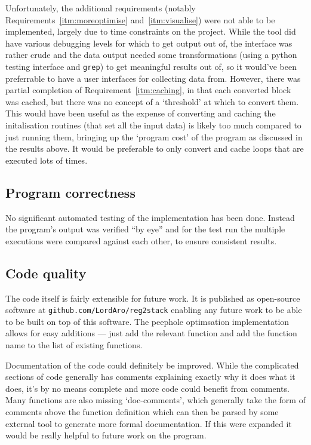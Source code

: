 Unfortunately, the additional requirements (notably
Requirements~\ref{itm:moreoptimise} and~\ref{itm:visualise}) were not able to be
implemented, largely due to time constraints on the project. While the tool did
have various debugging levels for which to get output out of, the interface was
rather crude and the data output needed some transformations (using a python
testing interface and \texttt{grep}) to get meaningful results out of, so it
would've been preferrable to have a user interfaces for collecting data from.
However, there was partial completion of Requirement~\ref{itm:caching}, in that
each converted block was cached, but there was no concept of a `threshold' at
which to convert them. This would have been useful as the expense of converting
and caching the initalisation routines (that set all the input data) is likely
too much compared to just running them, bringing up the `program cost' of the
program as discussed in the results above. It would be preferable to only
convert and cache loops that are executed lots of times.

\subsection{Program correctness}
No significant automated testing of the implementation has been done. Instead
the program's output was verified ``by eye'' and for the test run the multiple
executions were compared against each other, to ensure consistent results.

\subsection{Code quality}
The code itself is fairly extensible for future work. It is published as
open-source software at \texttt{github.com/LordAro/reg2stack} enabling any
future work to be able to be built on top of this software. The peephole
optimsation implementation allows for easy additions --- just add the relevant
function and add the function name to the list of existing functions.

Documentation of the code could definitely be improved. While the complicated
sections of code generally has comments explaining exactly why it does what it
does, it's by no means complete and more code could benefit from comments. Many
functions are also missing `doc-comments', which generally take the form of
comments above the function definition which can then be parsed by some external
tool to generate more formal documentation. If this were expanded it would be
really helpful to future work on the program.
